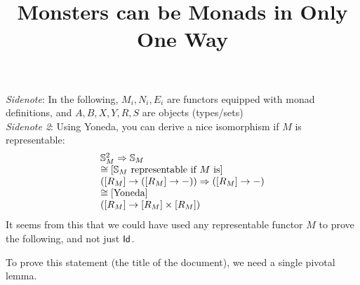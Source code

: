 \documentclass{article}
\title{Monsters can be Monads in Only One Way}
\begin{document}


\newcommand{\tabulatef}{\mathsf{tabulate}}
\newcommand{\indexf}{\mathsf{index}}
\newcommand{\sfork}{\mathsf{sfork}}
\newcommand{\Set}{\mathsf{Set}}

\maketitle

\textit{Sidenote}: In the following, $M_i, N_i, E_i$ are functors equipped with monad definitions, and $A,B,X,Y,R,S$ are objects (types/sets)\\

\textit{Sidenote 2}: Using Yoneda, you can derive a nice isomorphism if $M$ is representable:
$$
\begin{array}{ll}
	\mathbb{S}_{M}^2 \Rightarrow \mathbb{S}_{M} \\
	\cong \text{[$\mathbb{S}_{M}$ representable if $M$ is]} \\
	([R_M] \to ([R_M] \to -)) \Rightarrow ([R_M] \to -) \\
	\cong \text{[Yoneda]} \\
	([R_M] \to [R_M] \times [R_M])
\end{array}
$$
It seems from this that we could have used any representable functor $M$ to prove the following, and not just $\mathsf{Id}$.

\vspace{1cm}

To prove this statement (the title of the document), we need a single pivotal lemma.
\end{document}

